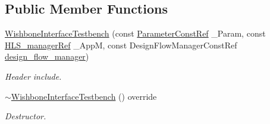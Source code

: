 \subsection*{Public Member Functions}
\begin{DoxyCompactItemize}
\item 
\hyperlink{classWishboneInterfaceTestbench_a7c6a2f55225f2d92dfca5d7921dff67e}{Wishbone\+Interface\+Testbench} (const \hyperlink{Parameter_8hpp_a37841774a6fcb479b597fdf8955eb4ea}{Parameter\+Const\+Ref} \+\_\+\+Param, const \hyperlink{hls__manager_8hpp_acd3842b8589fe52c08fc0b2fcc813bfe}{H\+L\+S\+\_\+manager\+Ref} \+\_\+\+AppM, const Design\+Flow\+Manager\+Const\+Ref \hyperlink{classDesignFlowStep_ab770677ddf087613add30024e16a5554}{design\+\_\+flow\+\_\+manager})
\begin{DoxyCompactList}\small\item\em Header include. \end{DoxyCompactList}\item 
\hyperlink{classWishboneInterfaceTestbench_ac5a3468a63abaf77f4c990558f2785ae}{$\sim$\+Wishbone\+Interface\+Testbench} () override
\begin{DoxyCompactList}\small\item\em Destructor. \end{DoxyCompactList}\end{DoxyCompactItemize}
